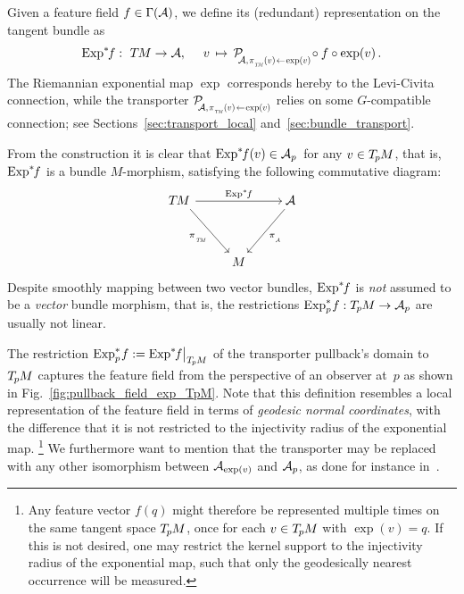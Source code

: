 \begin{dfn}
\label{dfn:Expf_pullback_field}
    Given a feature field $f \in \Gamma(\mathcal{A})$, we define its (redundant) representation on the tangent bundle as
    \begin{align}
        \Expsf :\ \TM \to \A, \quad\ 
        v \,\mapsto\, \PAexpv \!\circ f \circ \exp(v) \,.
    \end{align}
    The Riemannian exponential map $\exp$ corresponds hereby to the Levi-Civita connection, while the transporter $\PAexpv$ relies on some $G$-compatible connection; see Sections~\ref{sec:transport_local} and~\ref{sec:bundle_transport}.

    From the construction it is clear that $\operatorname{Exp}^*\mkern-5mu f(v) \in \mathcal{A}_p\,$ for any $v \in T_{\mkern-1.5mu p}\mkern-.5muM$, that is, $\operatorname{Exp}^*\mkern-5mu f$ is a bundle $M$-morphism, satisfying the following commutative diagram:
    \begin{equation}\label{eq:pullback_field_bundle_map}
        \begin{tikzcd}[row sep=3.5em, column sep=2.5em]
            \TM  \arrow[rd, start anchor={[xshift=.6ex]}, "\piTM"']
                \arrow[rr, "\Expsf"]
            & &
            \mkern-3mu
            \A
                \arrow[ld, "\piA"] \\
            & M &
        \end{tikzcd}
    \end{equation}
    Despite smoothly mapping between two vector bundles, $\operatorname{Exp}^*\mkern-5mu f$ is \emph{not} assumed to be a \emph{vector} bundle morphism, that is, the restrictions $\operatorname{Exp}^*_p\mkern-2mu f: T_{\mkern-1.5mu p}\mkern-.5muM \to \mathcal{A}_p$ are usually not linear.
\end{dfn}
The restriction $\operatorname{Exp}^*_p\mkern-2mu f := \operatorname{Exp}^*\mkern-5mu f\big|_{T_{\mkern-1.5mu p}\mkern-.5muM}$ of the transporter pullback's domain to $T_{\mkern-1.5mu p}\mkern-.5muM$ captures the feature field from the perspective of an observer at~$p$ as shown in Fig.~\ref{fig:pullback_field_exp_TpM}.
Note that this definition resembles a local representation of the feature field in terms of \emph{geodesic normal coordinates}, with the difference that it is not restricted to the injectivity radius of the exponential map.%
\footnote{
    Any feature vector $f(q)$ might therefore be represented multiple times on the same tangent space $T_{\mkern-1.5mu p}\mkern-.5muM$, once for each $v\in T_{\mkern-1.5mu p}\mkern-.5muM$ with $\exp(v)=q$.
    If this is not desired, one may restrict the kernel support to the injectivity radius of the exponential map, such that only the geodesically nearest occurrence will be measured.
}
We furthermore want to mention that the transporter may be replaced with any other isomorphism between $\mathcal{A}_{\exp(v)}$ and $\mathcal{A}_p$, as done for instance in~\cite{sommer2019horizontal}.


